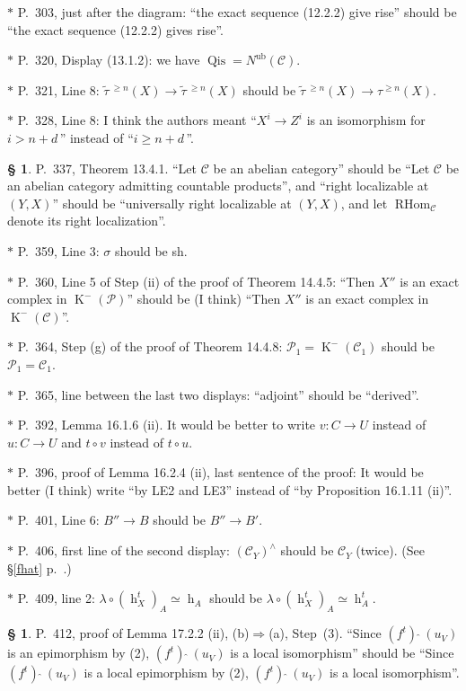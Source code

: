 \documentclass[12pt]{article}%
\theoremstyle{remark}
\theoremstyle{definition}
\newtheorem{s}[thm]{\S}%
\newcommand{\nn}{\noindent}
\newcommand{\cc}{\mathcal}
\newcommand{\mc}{\mathcal}
\newcommand{\oo}{\operatorname}
\newcommand{\C}{\mathcal C}
\newcommand{\fthat}{(f^t)\ \widehat{}\ }
\newcommand{\then}{\Rightarrow}
\begin{document}
\nn$*$ P.~303, just after the diagram: ``the exact sequence (12.2.2) give rise'' should be ``the exact sequence (12.2.2) gives rise''.

\nn$*$ P.~320, Display (13.1.2): we have $\oo{Qis}=N^{\oo{ub}}(\C)$.

\nn$*$ P.~321, Line 8: $\widetilde\tau\,{}^{\ge n}(X)\to\widetilde\tau\,{}^{\ge n}(X)$ should be $\widetilde\tau\,{}^{\ge n}(X)\to\tau^{\ge n}(X)$.

\nn$*$ P.~328, Line 8: I think the authors meant ``$X^i\to Z^i$ is an isomorphism for $i>n+d\,$'' instead of ``$i\ge n+d\,$''.

\begin{s}\label{1341}
P.~337, Theorem 13.4.1. ``Let $\C$ be an abelian category'' should be ``Let $\C$ be an abelian category admitting countable products'', and ``right localizable at $(Y,X)$'' should be ``universally right localizable at $(Y,X)$, and let $\oo{RHom}_\C$ denote its right localization''.
\end{s}

\nn$*$ P.~359, Line 3: $\sigma$ should be sh.

\nn$*$ P.~360, Line 5 of Step (ii) of the proof of Theorem 14.4.5: ``Then $X''$ is an exact complex in $\oo K^-(\cc P)$'' should be (I think) ``Then $X''$ is an exact complex in $\oo K^-(\cc C)$''.

\nn$*$ P.~364, Step (g) of the proof of Theorem 14.4.8: $\mc P_1=\oo K^-(\C_1)$ should be $\mc P_1=\C_1$.

\nn$*$ P.~365, line between the last two displays: ``adjoint'' should be ``derived''.

\nn$*$ P.~392, Lemma 16.1.6 (ii). It would be better to write $v:C\to U$ instead of $u:C\to U$ and $t\circ v$ instead of $t\circ u$.

\nn$*$ P.~396, proof of Lemma 16.2.4 (ii), last sentence of the proof: It would be better (I think) write ``by LE2 and LE3'' instead of ``by Proposition 16.1.11 (ii)''.

\nn$*$ P.~401, Line 6: $B''\to B$ should be $B''\to B'$.

\nn$*$ P.~406, first line of the second display: $(\C_Y)^\wedge$ should be $\C_Y$ (twice). (See \S\ref{fhat} p.~\pageref{fhat}.)

\nn$*$ P.~409, line 2: $\lambda\circ(\oo h_X^t)_A\simeq\oo h_A$ should be $\lambda\circ(\oo h_X^t)_A\simeq\oo h_A^t$. 

\begin{s}\label{1722}
P.~412, proof of Lemma 17.2.2 (ii), (b)$\then$(a), Step~(3). ``Since $\fthat(u_V)$ is an epimorphism by (2), $\fthat(u_V)$ is a local isomorphism'' should be ``Since $\fthat(u_V)$ is a local epimorphism by (2), $\fthat(u_V)$ is a local isomorphism''.
\end{s}
\end{document}
